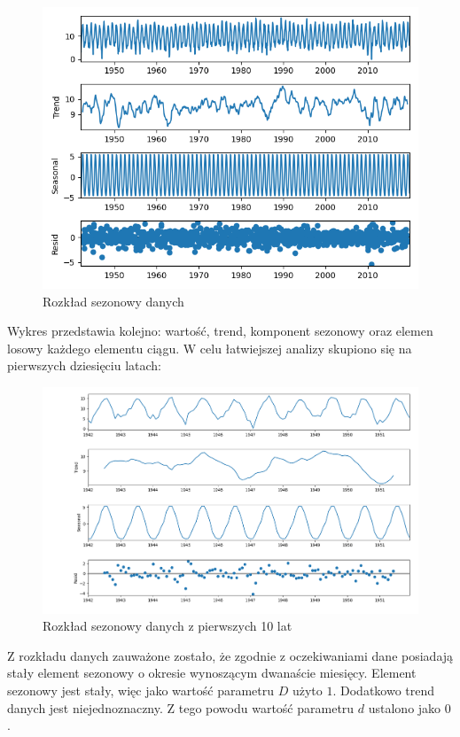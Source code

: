 \documentclass[12pt]{article}
\begin{document}
\begin{figure}[H]
    \includegraphics[width=\textwidth]{img/decomposition.png}
    \caption{Rozkład sezonowy danych}
\end{figure}

Wykres przedstawia kolejno: wartość, trend, komponent sezonowy oraz elemen losowy każdego elementu ciągu. W celu łatwiejszej analizy skupiono się na pierwszych dziesięciu latach:

\begin{figure}[H]
    \includegraphics[width=\textwidth]{img/decomposition_10y.png}
    \caption{Rozkład sezonowy danych z pierwszych 10 lat}
\end{figure}

Z rozkładu danych zauważone zostało, że zgodnie z oczekiwaniami dane posiadają stały element sezonowy o okresie wynoszącym dwanaście miesięcy. Element sezonowy jest stały, więc jako wartość parametru $D$ użyto $1$. Dodatkowo trend danych jest niejednoznaczny. Z tego powodu wartość parametru $d$ ustalono jako $0$.
\end{document}
